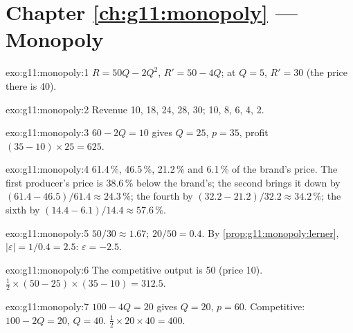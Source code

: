 \section*{Chapter \ref{ch:g11:monopoly} --- Monopoly}

\begin{solution}{exo:g11:monopoly:1}
$R = 50Q - 2Q^2$, $R' = 50 - 4Q$; at $Q = 5$, $R' = 30$ (the price there is 40).
\end{solution}

\begin{solution}{exo:g11:monopoly:2}
Revenue 10, 18, 24, 28, 30;  10, 8, 6, 4, 2.
\end{solution}

\begin{solution}{exo:g11:monopoly:3}
$60 - 2Q = 10$ gives $Q = 25$, $p = 35$, profit $(35 - 10) \times 25 = 625$.
\end{solution}

\begin{solution}{exo:g11:monopoly:4}
61.4\,\%, 46.5\,\%, 21.2\,\% and 6.1\,\% of the brand's price. The first producer's price is 38.6\,\% below the brand's; the second brings it down by $(61.4 - 46.5)/61.4 \approx
24.3\,\%$; the fourth by $(32.2 - 21.2)/32.2 \approx 34.2\,\%$; the sixth by $(14.4 - 6.1)/14.4 \approx 57.6\,\%$.
\end{solution}

\begin{solution}{exo:g11:monopoly:5}
 $50/30 \approx 1.67$;  $20/50 = 0.4$. By \cref{prop:g11:monopoly:lerner}, $|\varepsilon| = 1/0.4 = 2.5$: $\varepsilon = -2.5$.
\end{solution}

\begin{solution}{exo:g11:monopoly:6}
The competitive output is 50 (price 10).  $\tfrac12 \times (50 - 25) \times (35 - 10) = 312.5$.
\end{solution}

\begin{solution}{exo:g11:monopoly:7}
$100 - 4Q = 20$ gives $Q = 20$, $p = 60$. Competitive: $100 - 2Q = 20$, $Q = 40$.  $\tfrac12 \times 20 \times 40 = 400$.
\end{solution}

